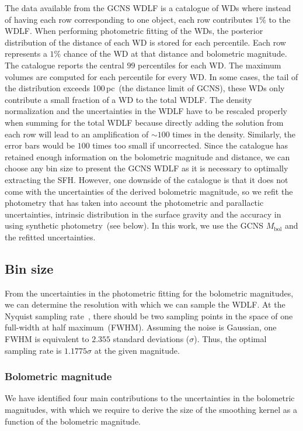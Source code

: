 \documentclass[fleqn,usenatbib]{mnras}
\begin{document}
The data available from the GCNS WDLF is a catalogue of WDs where instead of
having each row corresponding to one object, each row contributes $1\%$ to the
WDLF. When performing photometric fitting of the WDs, the posterior distribution
of the distance of each WD is stored for each percentile. Each row represents
a $1\%$ chance of the WD at that distance and bolometric magnitude. The catalogue
reports the central $99$ percentiles for each WD. The maximum volumes are computed
for each percentile for every WD. In some cases, the tail of the distribution
exceeds 100\,pc~(the distance limit of GCNS), these WDs only contribute a small
fraction of a WD to the total WDLF. The density normalization and the
uncertainties in the WDLF have to be rescaled properly when summing for the
total WDLF because directly adding the solution from each row will lead to an
amplification of $\sim$$100$ times in the density. Similarly, the error bars
would be $100$ times too small if uncorrected. Since the catalogue has retained
enough information on the bolometric magnitude and distance, we can choose any
bin size to present the GCNS WDLF as it is necessary to optimally extracting
the SFH. However, one downside of the catalogue is that it does not come with
the uncertainties of the derived bolometric magnitude, so we refit the photometry
that has taken into account the photometric and parallactic uncertainties,
intrinsic distribution in the surface gravity and the accuracy in using
synthetic photometry~(see below). In this work, we use the GCNS $M_\mathrm{bol}$
and the refitted uncertainties.

\subsection{Bin size}
\label{sec:magnitude_bin_size}
From the uncertainties in the photometric fitting for the bolometric magnitudes,
we can determine the resolution with which we can sample the WDLF. At the Nyquist
sampling rate~\citep{1949IEEEP..37...10S}, there should be two sampling points
in the space of one full-width at half maximum~(FWHM). Assuming the noise is
Gaussian, one FWHM is equivalent to $2.355$ standard deviations ($\sigma$).
Thus, the optimal sampling rate is $1.1775\sigma$ at the given magnitude.

\subsubsection{Bolometric magnitude}
We have identified four main contributions to the uncertainties in the
bolometric magnitudes, with which we require to derive the size of the
smoothing kernel as a function of the bolometric magnitude.
\end{document}
